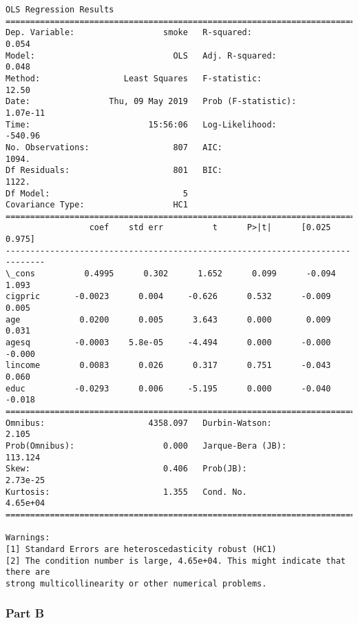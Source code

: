 \documentclass[11pt]{article}
\begin{document}
    \begin{Verbatim}[commandchars=\\\{\}]
                            OLS Regression Results                            
==============================================================================
Dep. Variable:                  smoke   R-squared:                       0.054
Model:                            OLS   Adj. R-squared:                  0.048
Method:                 Least Squares   F-statistic:                     12.50
Date:                Thu, 09 May 2019   Prob (F-statistic):           1.07e-11
Time:                        15:56:06   Log-Likelihood:                -540.96
No. Observations:                 807   AIC:                             1094.
Df Residuals:                     801   BIC:                             1122.
Df Model:                           5                                         
Covariance Type:                  HC1                                         
==============================================================================
                 coef    std err          t      P>|t|      [0.025      0.975]
------------------------------------------------------------------------------
\_cons          0.4995      0.302      1.652      0.099      -0.094       1.093
cigpric       -0.0023      0.004     -0.626      0.532      -0.009       0.005
age            0.0200      0.005      3.643      0.000       0.009       0.031
agesq         -0.0003    5.8e-05     -4.494      0.000      -0.000      -0.000
lincome        0.0083      0.026      0.317      0.751      -0.043       0.060
educ          -0.0293      0.006     -5.195      0.000      -0.040      -0.018
==============================================================================
Omnibus:                     4358.097   Durbin-Watson:                   2.105
Prob(Omnibus):                  0.000   Jarque-Bera (JB):              113.124
Skew:                           0.406   Prob(JB):                     2.73e-25
Kurtosis:                       1.355   Cond. No.                     4.65e+04
==============================================================================

Warnings:
[1] Standard Errors are heteroscedasticity robust (HC1)
[2] The condition number is large, 4.65e+04. This might indicate that there are
strong multicollinearity or other numerical problems.

    \end{Verbatim}

    \subsubsection*{Part B}\label{part-b}
\end{document}
